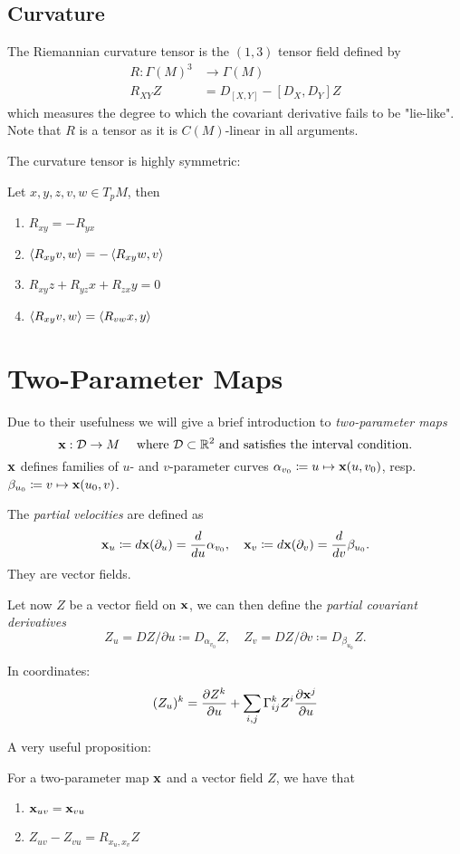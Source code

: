 \subsection{Curvature}
The Riemannian curvature tensor is the $(1,3)$ tensor field defined by 
\begin{align*}
    R:\Gamma(M)^3&\to\Gamma(M)\\
    R_{XY}Z &= D_{[X,Y]} - [D_X,D_Y]Z
\end{align*}
which measures the degree to which the covariant derivative fails to be "lie-like".
Note that $R$ is a tensor as it is $C(M)$-linear in all arguments.

The curvature tensor is highly symmetric:
\begin{proposition}Let $x,y,z,v,w\in T_pM$, then

\begin{enumerate}
    \item $R_{xy}=-R_{yx}$
    \item $\left\langle R_{xy}v,w \right\rangle=-\left\langle R_{xy}w,v \right\rangle$
    \item $R_{xy}z+R_{yz}x+R_{zx}y=0$
    \item $\left\langle R_{xy}v,w \right\rangle=\left\langle R_{vw}x,y \right\rangle$
\end{enumerate}
\end{proposition}

\section{Two-Parameter Maps}
Due to their usefulness we will give a brief introduction to \emph{two-parameter maps}
\[
\mathbf{x}:\mathcal{D}\to M \quad \text{ where } \mathcal{D}\subset \mathbb{R}^2 \text{ and satisfies the interval condition.}
\]
$\mathbf{x}$ defines families of $u$- and $v$-parameter curves $\alpha_{v_0}\coloneqq u\mapsto \mathbf{x}(u,v_0)$, resp. $\beta_{u_0}\coloneqq v\mapsto \mathbf{x}(u_0,v)$.

The \emph{partial velocities} are defined as
\[
\mathbf{x}_u \coloneqq d\mathbf{x}(\partial_u) = \frac{d}{du}\alpha_{v_0}, \quad \mathbf{x}_v \coloneqq d\mathbf{x}(\partial_v) = \frac{d}{dv}\beta_{u_0}.
\]
They are vector fields.

Let now $Z$ be a vector field on $\mathbf{x}$, we can then define the \emph{partial covariant derivatives}
\[
Z_u = DZ/\partial u \coloneqq D_{\alpha_{v_0}}Z, \quad Z_v = DZ/\partial v \coloneqq D_{\beta_{u_0}}Z.
\]

In coordinates: 
\[
(Z_u)^k = \frac{\partial Z^k}{\partial u} + \sum_{i,j}\Gamma_{ij}^kZ^i\frac{\partial \mathbf{x}^j}{\partial u}
\]

A very useful proposition:
\begin{proposition} For a two-parameter map $\mathbf{x}$ and a vector field $Z$, we have that


\begin{enumerate}
    \item $\mathbf{x}_{uv}=\mathbf{x}_{vu}$
    \item $Z_{uv}-Z_{vu} = R_{x_u,x_v}Z$
\end{enumerate}
\end{proposition}


